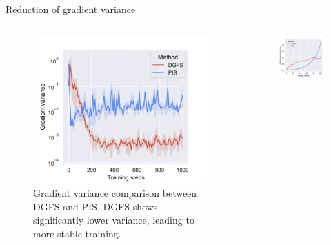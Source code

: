 \documentclass[aspectratio=169,xcolor=dvipsnames]{beamer}
\begin{document}
\begin{frame}[t]{Reduction of gradient variance}
\footnotesize

\begin{columns}[t]
\begin{column}{0.33\textwidth}
\begin{figure}
    \centering
    \includegraphics[width=\textwidth]{figures/grad_variance.png}
    \caption{Gradient variance comparison between DGFS and PIS. DGFS shows significantly lower variance, leading to more stable training.}
\end{figure}
\end{column}
\begin{column}{0.33\textwidth}
\begin{figure}
    \centering
    \includegraphics[width=\textwidth]{figures/drift.png}

\end{figure}
\end{column}
\end{columns}
\end{frame}
\end{document}
